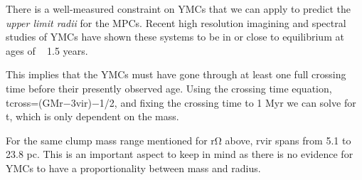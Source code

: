 There is a well-measured constraint on YMCs that we can apply to predict the \textit{upper limit radii} for the MPCs. Recent high resolution imagining and spectral studies of YMCs have shown these systems to be in or close to equilibrium at ages of ~ 1.5  years. \cite{Darwin_1900}

This implies that the YMCs must have gone through at least one full crossing time before their presently observed age. Using the crossing time equation, tcross=(GMr−3vir)−1/2, and fixing the crossing time to 1 Myr we can solve for t, which is only dependent on the mass. \cite{1999}

For the same clump mass range mentioned for rΩ above, rvir spans from 5.1 to 23.8 pc. This is an important aspect to keep in mind as there is no evidence for YMCs to have a proportionality between mass and radius. \cite{Bedini_2013}